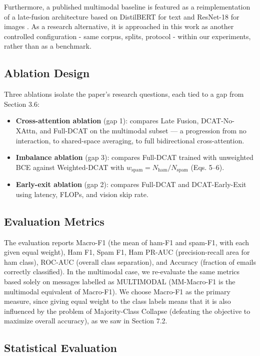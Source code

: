 \documentclass[10pt,twoside]{article}
\begin{document}
Furthermore, a published multimodal baseline is featured as a reimplementation of a late-fusion architecture based on DistilBERT for text and ResNet-18 for images \citep{zhang2023mmtd}. As a research alternative, it is approached in this work as another controlled configuration - same corpus, splits, protocol - within our experiments, rather than as a benchmark.

\subsection{Ablation Design}\label{sec:6.4}

Three ablations isolate the paper's research questions, each tied to a gap from Section 3.6:

\begin{itemize}[leftmargin=*,itemsep=1.5pt]
\item \textbf{Cross-attention ablation} (gap 1): compares Late Fusion, DCAT-No-XAttn, and Full-DCAT on the multimodal subset --- a progression from no interaction, to shared-space averaging, to full bidirectional cross-attention.
\item \textbf{Imbalance ablation} (gap 3): compares Full-DCAT trained with unweighted BCE against Weighted-DCAT with $w_{\text{spam}} = N_{\text{ham}} / N_{\text{spam}}$ (Eqs. 5--6).
\item \textbf{Early-exit ablation} (gap 2): compares Full-DCAT and DCAT-Early-Exit using latency, FLOPs, and vision skip rate.
\end{itemize}

\subsection{Evaluation Metrics}\label{sec:6.5}

The evaluation reports Macro-F1 (the mean of ham-F1 and spam-F1, with each given equal weight), Ham F1, Spam F1, Ham PR-AUC (precision-recall area for ham class), ROC-AUC (overall class separation), and Accuracy (fraction of emails correctly classified). In the multimodal case, we re-evaluate the same metrics based solely on messages labelled as MULTIMODAL (MM-Macro-F1 is the multimodal equivalent of Macro-F1). We choose Macro-F1 as the primary measure, since giving equal weight to the class labels means that it is also influenced by the problem of Majority-Class Collapse (defeating the objective to maximize overall accuracy), as we saw in Section 7.2.

\subsection{Statistical Evaluation}\label{sec:6.6}
\end{document}
